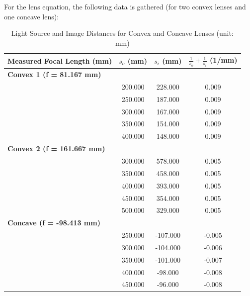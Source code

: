 \documentclass{article}
\begin{document}
For the lens equation, the following data is gathered (for two convex lenses and one concave lens):
\begin{table}[h!]
\centering
\begin{tabular}{l||c|c|c}
\hline
\textbf{Measured Focal Length (mm)} & \textbf{$s_o$ (mm)} & \textbf{$s_i$ (mm)} & \textbf{$\frac{1}{s_o}+\frac{1}{s_i}$ (1/mm)} \\
\hline
\multicolumn{4}{l}{\textbf{Convex 1 (f = 81.167 mm)}} \\
 & 200.000 & 228.000 & 0.009 \\
 & 250.000 & 187.000 & 0.009 \\
 & 300.000 & 167.000 & 0.009 \\
 & 350.000 & 154.000 & 0.009 \\
 & 400.000 & 148.000 & 0.009 \\
\hline
\multicolumn{4}{l}{\textbf{Convex 2 (f = 161.667 mm)}} \\
 & 300.000 & 578.000 & 0.005 \\
 & 350.000 & 458.000 & 0.005 \\
 & 400.000 & 393.000 & 0.005 \\
 & 450.000 & 354.000 & 0.005 \\
 & 500.000 & 329.000 & 0.005 \\
\hline
\multicolumn{4}{l}{\textbf{Concave (f = -98.413 mm)}} \\
 & 250.000 & -107.000 & -0.005 \\
 & 300.000 & -104.000 & -0.006 \\
 & 350.000 & -101.000 & -0.007 \\
 & 400.000 & -98.000 & -0.008 \\
 & 450.000 & -96.000 & -0.008 \\
\hline
\end{tabular}
\caption{Light Source and Image Distances for Convex and Concave Lenses (unit: mm)}
\label{tab:lens_eq}
\end{table}
\end{document}
